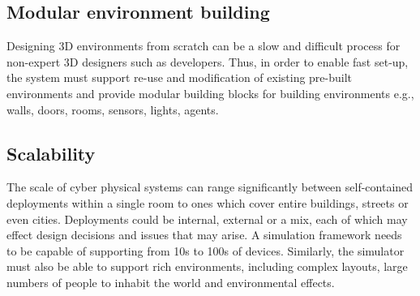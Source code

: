 \subsection{Modular environment building}
\label{sub:requirements_modular_building}
Designing 3D environments from scratch can be a slow and difficult process for non-expert 3D designers such as developers. Thus, in order to enable fast set-up, the system must support re-use and modification of existing pre-built environments and provide modular building blocks for building environments e.g., walls, doors, rooms, sensors, lights, agents.


\subsection{Scalability} %
\label{sub:requirements_scalability}
The scale of cyber physical systems can range significantly between self-contained deployments within a single room to ones which cover entire buildings, streets or even cities. Deployments could be internal, external or a mix, each of which may effect design decisions and issues that may arise. A simulation framework needs to be capable of supporting from 10s to 100s of devices. Similarly, the simulator must also be able to support rich environments, including complex layouts, large numbers of people to inhabit the world and environmental effects.













